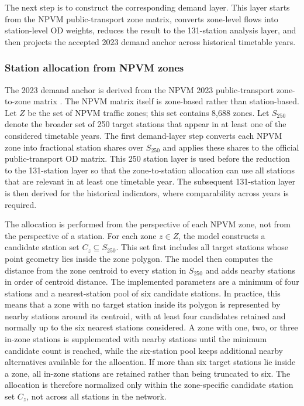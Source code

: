 \documentclass[preprint,12pt]{elsarticle}
\begin{document}
The next step is to construct the corresponding demand layer. This layer starts from the NPVM public-transport zone matrix, converts zone-level flows into station-level OD weights, reduces the result to the 131-station analysis layer, and then projects the accepted 2023 demand anchor across historical timetable years.

\subsubsection{Station allocation from NPVM zones}\label{sec:methods-part1-npvm}

The 2023 demand anchor is derived from the NPVM 2023 public-transport zone-to-zone matrix \citep{vmuvek2026npvm2023}. The NPVM matrix itself is zone-based rather than station-based. Let $Z$ be the set of NPVM traffic zones; this set contains 8,688 zones. Let $S_{250}$ denote the broader set of 250 target stations that appear in at least one of the considered timetable years. The first demand-layer step converts each NPVM zone into fractional station shares over $S_{250}$ and applies these shares to the official public-transport OD matrix. This 250 station layer is used before the reduction to the 131-station layer so that the zone-to-station allocation can use all stations that are relevant in at least one timetable year. The subsequent 131-station layer is then derived for the historical indicators, where comparability across years is required.

The allocation is performed from the perspective of each NPVM zone, not from the perspective of a station. For each zone $z\in Z$, the model constructs a candidate station set $C_z\subseteq S_{250}$. This set first includes all target stations whose point geometry lies inside the zone polygon. The model then computes the distance from the zone centroid to every station in $S_{250}$ and adds nearby stations in order of centroid distance. The implemented parameters are a minimum of four stations and a nearest-station pool of six candidate stations. In practice, this means that a zone with no target station inside its polygon is represented by nearby stations around its centroid, with at least four candidates retained and normally up to the six nearest stations considered. A zone with one, two, or three in-zone stations is supplemented with nearby stations until the minimum candidate count is reached, while the six-station pool keeps additional nearby alternatives available for the allocation. If more than six target stations lie inside a zone, all in-zone stations are retained rather than being truncated to six. The allocation is therefore normalized only within the zone-specific candidate station set $C_z$, not across all stations in the network.
\end{document}
